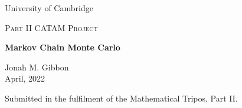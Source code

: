 \documentclass[10pt,a4paper,notitlepage]{article}
\begin{document}
\begin{titlepage}
	\centering
	\vspace*{5cm}
	{\large{University of Cambridge} \par}
	\vspace{1cm}
	{\Large \textsc{Part II CATAM Project}\par}
	\vspace{1.5cm}
	{\huge\bfseries Markov Chain Monte Carlo\par}
	\vspace{2cm}
	{\Large Jonah M. Gibbon\\ \vspace{0.6cm} April, 2022}
	\vfill
	


	{Submitted in the fulfilment of the Mathematical Tripos, Part II.}
\end{titlepage}
\end{document}
